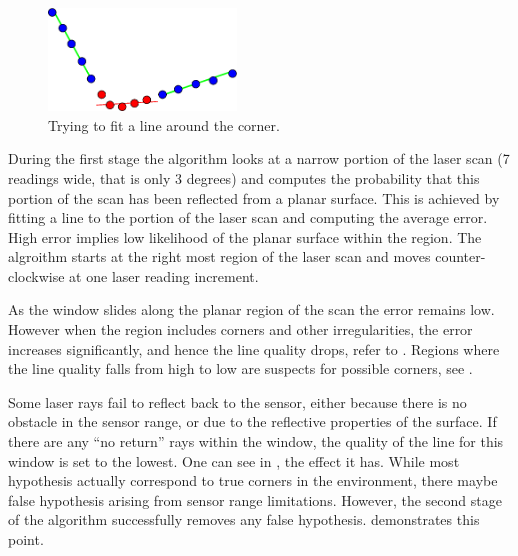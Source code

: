 \begin{figure}[htbp]
  \centering
  \includegraphics[width=5cm]{Pics/fig_corner_example}
  \caption{Trying to fit a line around the corner.}
  \label{fig:corner_example}
\end{figure}

During the first stage the algorithm looks at a narrow portion of the
laser scan (7 readings wide, that is only 3 degrees) and computes the
probability that this portion of the scan has been reflected from a
planar surface. This is achieved by fitting a line to the portion of
the laser scan and computing the average error. High error implies low
likelihood of the planar surface within the region. The algroithm starts
at the right most region of the laser scan and moves counter-clockwise
at one laser reading increment.

As the window slides along the planar region of the scan the error
remains low. However when the region includes corners and other
irregularities, the error increases significantly, and hence the line
quality drops, refer to . Regions where
the line quality falls from high to low are suspects for possible
corners, see .

Some laser rays fail to reflect back to the sensor, either because
there is no obstacle in the sensor range, or due to the reflective
properties of the surface. If there are any ``no return'' rays within
the window, the quality of the line for this window is set to the
lowest. One can see in , the
effect it has. While most hypothesis actually correspond to true
corners in the environment, there maybe false hypothesis arising from
sensor range limitations. However, the second stage of the algorithm
successfully removes any false hypothesis.
 demonstrates this point.

